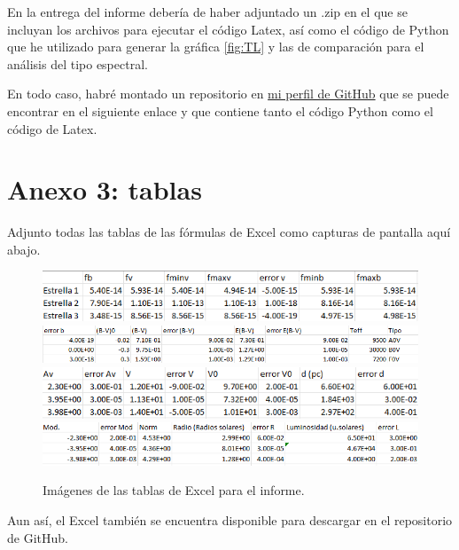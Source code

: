 \documentclass{aa} %
\begin{document}
En la entrega del informe debería de haber adjuntado un .zip en el que se incluyan los archivos para ejecutar el código Latex, así como el código de Python que he utilizado para generar la gráfica \ref{fig:TL} y las de comparación para el análisis del tipo espectral.

En todo caso, habré montado un repositorio en \href{https://github.com/luisgotsky}{mi perfil de GitHub} que se puede encontrar en el siguiente enlace y que contiene tanto el código Python como el código de Latex. 

\section{Anexo 3: tablas}

Adjunto todas las tablas de las fórmulas de Excel como capturas de pantalla aquí abajo.

\begin{figure}[h!]
\begin{center}
\includegraphics[scale=0.4]{tabla1.png}
\includegraphics[scale=0.4]{tabla2.png}
\includegraphics[scale=0.4]{tabla3.png}
\includegraphics[scale=0.4]{tabla4.png}
\caption{Imágenes de las tablas de Excel para el informe.}
\end{center}
\end{figure}

Aun así, el Excel también se encuentra disponible para descargar en el repositorio de GitHub.

\end{document}
